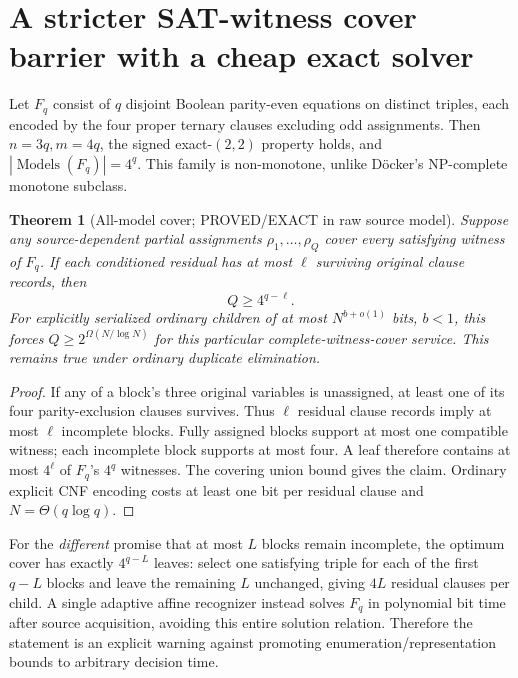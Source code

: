\documentclass[11pt]{article}
\newtheorem{theorem}{Theorem}
\begin{document}
\section{A stricter SAT-witness cover barrier with a cheap exact solver}
Let $F_q$ consist of $q$ disjoint Boolean parity-even equations on distinct triples, each encoded by the four proper ternary clauses excluding odd assignments. Then $n=3q,m=4q$, the signed exact-$(2,2)$ property holds, and $|\operatorname{Models}(F_q)|=4^q$. This family is non-monotone, unlike D\"ocker's NP-complete monotone subclass.
\begin{theorem}[All-model cover; PROVED/EXACT in raw source model]
Suppose any source-dependent partial assignments $\rho_1,\ldots,\rho_Q$ cover \emph{every satisfying witness} of $F_q$. If each conditioned residual has at most $\ell$ surviving original clause records, then
\[
\boxed{Q\ge 4^{q-\ell}.}
\]
For explicitly serialized ordinary children of at most $N^{b+o(1)}$ bits, $b<1$, this forces $Q\ge 2^{\Omega(N/\log N)}$ for this particular complete-witness-cover service. This remains true under ordinary duplicate elimination.
\end{theorem}
\begin{proof}
If any of a block's three original variables is unassigned, at least one of its four parity-exclusion clauses survives. Thus $\ell$ residual clause records imply at most $\ell$ incomplete blocks. Fully assigned blocks support at most one compatible witness; each incomplete block supports at most four. A leaf therefore contains at most $4^\ell$ of $F_q$'s $4^q$ witnesses. The covering union bound gives the claim. Ordinary explicit CNF encoding costs at least one bit per residual clause and $N=\Theta(q\log q)$.
\end{proof}
For the \emph{different} promise that at most $L$ blocks remain incomplete, the optimum cover has exactly $4^{q-L}$ leaves: select one satisfying triple for each of the first $q-L$ blocks and leave the remaining $L$ unchanged, giving $4L$ residual clauses per child. A single adaptive affine recognizer instead solves $F_q$ in polynomial bit time after source acquisition, avoiding this entire solution relation. Therefore the statement is an explicit warning against promoting enumeration/representation bounds to arbitrary decision time.
\end{document}

